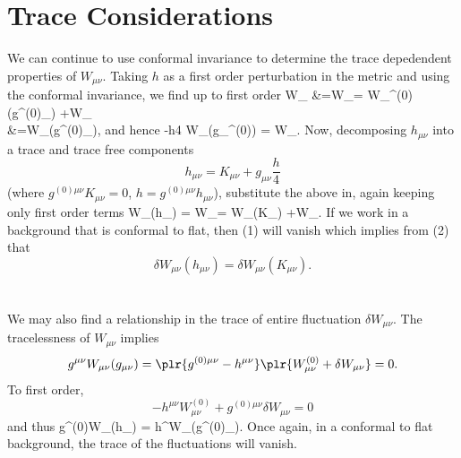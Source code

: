\documentclass[10pt,letterpaper]{article}
\begin{document}
\section*{Trace Considerations}
We can continue to use conformal invariance to determine the trace depedendent properties of $W_{\mu\nu}$. Taking $h$ as a first order perturbation in the metric and using the conformal invariance, we find up to first order 
\ba
	W_{\mu\nu} &=W_{\mu\nu}= W_{\mu\nu}^{(0)}(g^{(0)}_{\mu\nu}) +\delta W_{\mu\nu} \\
&=W_{\mu\nu}(g^{(0)}_{\mu\nu}),
\ea
and hence
\be
	-\frac h4 W_{\mu\nu}(g_{\mu\nu}^{(0)}) = \delta W_{\mu\nu}.
\ee
Now, decomposing $h_{\mu\nu}$ into a trace and trace free components
\[
	h_{\mu\nu} = K_{\mu\nu} + g_{\mu\nu}\frac h4
\]
(where $g^{(0)\mu\nu}K_{\mu\nu} = 0$, $h= g^{(0)\mu\nu}h_{\mu\nu}$), substitute the above in, again keeping only first order terms
\be
	\delta W_{\mu\nu}(h_{\mu\nu}) = \delta W_{\mu\nu}= \delta W_{\mu\nu}(K_{\mu\nu}) +\delta W_{\mu\nu}.
\ee
If we work in a background that is conformal to flat, then (1) will vanish which implies from (2) that
\[
	\delta W_{\mu\nu}(h_{\mu\nu}) = \delta W_{\mu\nu}(K_{\mu\nu}).
\]
\\ \\
We may also find a relationship in the trace of entire fluctuation $\delta W_{\mu\nu}$. The tracelessness of $W_{\mu\nu}$ implies
\[
	g^{\mu\nu}W_{\mu\nu}(g_{\mu\nu}) = \plr{ g^{(0)\mu\nu}-h^{\mu\nu}}\plr{ W^{(0)}_{\mu\nu}+ \delta W_{\mu\nu}}=0.
\]
To first order,
\[
	-h^{\mu\nu}W^{(0)}_{\mu\nu} + g^{(0)\mu\nu}\delta W_{\mu\nu} = 0
\]
and thus
\be
	g^{(0)\mu\nu}\delta W_{\mu\nu}(h_{\mu\nu}) = h^{\mu\nu}W_{\mu\nu}(g^{(0)}_{\mu\nu}).
\ee
Once again, in a conformal to flat background, the trace of the fluctuations will vanish. 
\\ \\ \\
\end{document}

